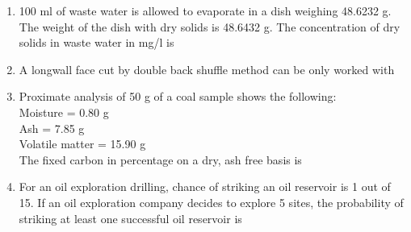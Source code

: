 \documentclass[journal]{IEEEtran}
\begin{document}
\begin{enumerate}
\item 
100 ml of waste water is allowed to evaporate in a dish weighing 48.6232 g. The weight of the dish with dry solids is 48.6432 g. The concentration of dry solids in waste water in mg/l is 
\begin{enumerate}
\end{enumerate}

\item 
A longwall face cut by double back shuffle method can be only worked with 
\begin{enumerate}
\end{enumerate}

\item 
Proximate analysis of 50 g of a coal sample shows the following: \\
Moisture = 0.80 g \\
Ash = 7.85 g \\
Volatile matter = 15.90 g \\
The fixed carbon in percentage on a dry, ash free basis is 
\begin{enumerate}
\end{enumerate}

\item 
For an oil exploration drilling, chance of striking an oil reservoir is 1 out of 15. If an oil exploration company decides to explore 5 sites, the probability of striking at least one successful oil reservoir is 
\begin{enumerate}
\end{enumerate}


\end{enumerate}
\end{document}
